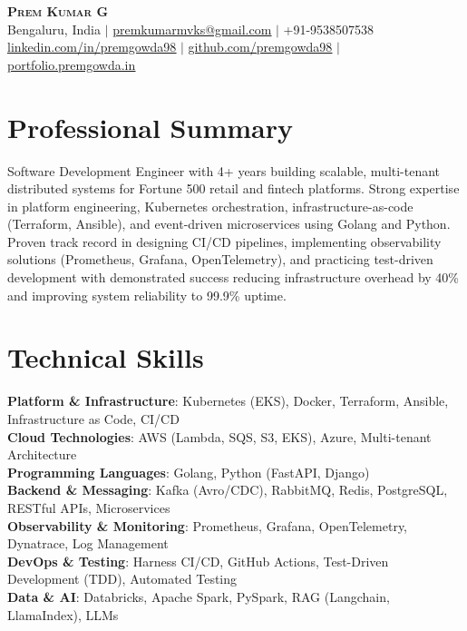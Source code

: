 \documentclass[letterpaper,11pt]{article}
\begin{document}
\begin{center}
    \textbf{\Huge \scshape Prem Kumar G} \\ \vspace{1pt}
    \small Bengaluru, India $|$
    \href{mailto:premkumarmvks@gmail.com}{\underline{premkumarmvks@gmail.com}} $|$
    +91-9538507538 \\
    \href{https://linkedin.com/in/premgowda98}{\underline{linkedin.com/in/premgowda98}} $|$
    \href{https://github.com/premgowda98}{\underline{github.com/premgowda98}} $|$
    \href{https://portfolio.premgowda.in}{\underline{portfolio.premgowda.in}}
\end{center}

\section{Professional Summary}
\small{Software Development Engineer with 4+ years building scalable, multi-tenant distributed systems for Fortune 500 retail and fintech platforms. Strong expertise in platform engineering, Kubernetes orchestration, infrastructure-as-code (Terraform, Ansible), and event-driven microservices using Golang and Python. Proven track record in designing CI/CD pipelines, implementing observability solutions (Prometheus, Grafana, OpenTelemetry), and practicing test-driven development with demonstrated success reducing infrastructure overhead by 40\% and improving system reliability to 99.9\% uptime.}

\section{Technical Skills}
 \begin{itemize}[leftmargin=0.15in, label={}]
    \small{\item{
     \textbf{Platform \& Infrastructure}{: Kubernetes (EKS), Docker, Terraform, Ansible, Infrastructure as Code, CI/CD} \\
     \textbf{Cloud Technologies}{: AWS (Lambda, SQS, S3, EKS), Azure, Multi-tenant Architecture} \\
     \textbf{Programming Languages}{: Golang, Python (FastAPI, Django)} \\
     \textbf{Backend \& Messaging}{: Kafka (Avro/CDC), RabbitMQ, Redis, PostgreSQL, RESTful APIs, Microservices} \\
     \textbf{Observability \& Monitoring}{: Prometheus, Grafana, OpenTelemetry, Dynatrace, Log Management} \\
     \textbf{DevOps \& Testing}{: Harness CI/CD, GitHub Actions, Test-Driven Development (TDD), Automated Testing} \\
     \textbf{Data \& AI}{: Databricks, Apache Spark, PySpark, RAG (Langchain, LlamaIndex), LLMs}
    }}
 \end{itemize}
\end{document}
